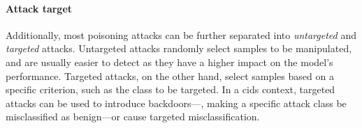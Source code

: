 \paragraph{Attack target}

Additionally, most poisoning attacks can be further separated into \emph{untargeted} and \emph{targeted} attacks.
Untargeted attacks randomly select samples to be manipulated, and are usually easier to detect as they have a higher impact on the model's performance.
Targeted attacks, on the other hand, select samples based on a specific criterion, such as the class to be targeted.
In a \gls{cids} context, targeted attacks can be used to introduce backdoors---\ie, making a specific attack class be misclassified as benign---or cause targeted misclassification.